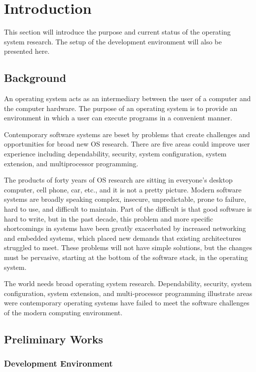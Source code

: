 \documentclass{swfcthesis}
\begin{document}
\mainmatter{}

\chapter{Introduction}
This section will introduce the purpose and current status of the operating system
research. The setup of the development environment will also be presented here.


\section{Background}
An operating system acts as an intermediary between the user of a computer and the
computer hardware. The purpose of an operating system is to provide an environment in
which a user can execute programs in a convenient manner\cite{abrahamoperating}.


Contemporary software systems are beset by problems that create challenges and
opportunities for broad new OS research. There are five areas could improve user
experience including dependability, security, system configuration, system extension, and
multiprocessor programming.

The products of forty years of OS research are sitting in everyone's desktop computer,
cell phone, car, etc., and it is not a pretty picture.  Modern software systems are
broadly speaking complex, insecure, unpredictable, prone to failure, hard to use, and
difficult to maintain. Part of the difficult is that good software is hard to write, but
in the past decade, this problem and more specific shortcomings in systems have been
greatly exacerbated by increased networking and embedded systems, which placed new demands
that existing architectures struggled to meet. These problems will not have simple
solutions, but the changes must be pervasive, starting at the bottom of the software
stack, in the operating system.

The world needs broad operating system research. Dependability, security, system
configuration, system extension, and multi-processor programming illustrate areas were
contemporary operating systems have failed to meet the software challenges of the modern
computing environment\cite{hunt2005broad}.

\section{Preliminary Works}

\subsection{Development Environment}
\end{document}
